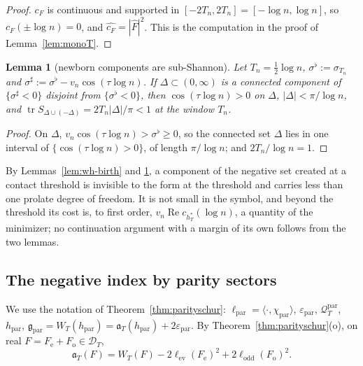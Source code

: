 \documentclass[11pt]{amsart}
\newtheorem{lemma}[theorem]{Lemma}
\theoremstyle{definition}
\theoremstyle{remark}
\newcommand{\Rel}{\operatorname{Re}}
\newcommand{\Fh}{\widehat F}
\newcommand{\cF}{c_F}
\begin{document}
\begin{proof}
$\cF$ is continuous and supported in $[-2T_n,2T_n]=[-\log n,\log n]$, so $\cF(\pm\log n)=0$, and
$\widehat{\cF}=|\Fh|^2$. This is the computation in the proof of Lemma~\ref{lem:monoT}.
\end{proof}

\begin{lemma}[newborn components are sub-Shannon]\label{lem:wh-shannon}
Let $T_n=\frac12\log n$, $\sigma^{\flat}:=\sigma_{T_n}$ and $\sigma^{\sharp}:=\sigma^\flat-v_n\cos(\tau\log n)$. If
$\Delta\subset(0,\infty)$ is a connected component of $\{\sigma^\sharp<0\}$ disjoint from $\{\sigma^\flat<0\}$, then
$\cos(\tau\log n)>0$ on $\Delta$, $|\Delta|<\pi/\log n$, and $\operatorname{tr}S_{\Delta\cup(-\Delta)}=2T_n|\Delta|/\pi<1$ at the window
$T_n$.
\end{lemma}

\begin{proof}
On $\Delta$, $v_n\cos(\tau\log n)>\sigma^\flat\ge0$, so the connected set $\Delta$ lies in one interval of
$\{\cos(\tau\log n)>0\}$, of length $\pi/\log n$; and $2T_n/\log n=1$.
\end{proof}

By Lemmas~\ref{lem:wh-birth} and \ref{lem:wh-shannon}, a component of the negative set created at a contact
threshold is invisible to the form at the threshold and carries less than one prolate degree of freedom. It is
not small in the symbol, and beyond the threshold its cost is, to first order, $v_n\Rel c_{h^*_T}(\log n)$, a
quantity of the minimizer; no continuation argument with a margin of its own follows from the two lemmas.

\subsection{The negative index by parity sectors}\label{subsec:wh-index}

We use the notation of Theorem~\ref{thm:parityschur}: $\ell_{\mathrm{par}}=\langle\cdot,\chi_{\mathrm{par}}\rangle$,
$\varepsilon_{\mathrm{par}}$, $\mathcal Q^{\mathrm{par}}_T$, $h_{\mathrm{par}}$, $\mathfrak g_{\mathrm{par}}=W_T(h_{\mathrm{par}})=\mathfrak a_T(h_{\mathrm{par}})+2\varepsilon_{\mathrm{par}}$. By
Theorem~\ref{thm:parityschur}(o), on real $F=F_{\mathrm e}+F_{\mathrm o}\in\mathcal D_T$,
\begin{equation}\label{eq:wh-aW}
\mathfrak a_T(F)=W_T(F)-2\ell_{\mathrm{ev}}(F_{\mathrm e})^2+2\ell_{\mathrm{odd}}(F_{\mathrm o})^2 .
\end{equation}
\end{document}
